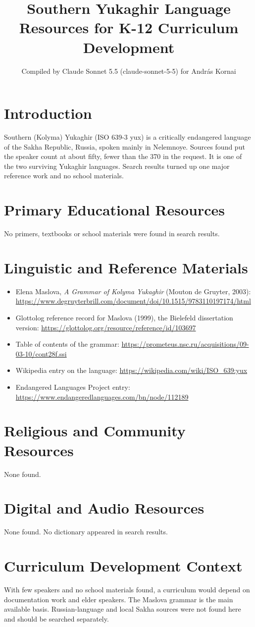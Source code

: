 \documentclass[12pt]{article}
\title{Southern Yukaghir Language Resources for K-12 Curriculum Development}
\author{Compiled by Claude Sonnet 5.5 (claude-sonnet-5-5) for Andr\'as Kornai}
\date{}
\begin{document}
\maketitle

\section{Introduction}
Southern (Kolyma) Yukaghir (ISO 639-3 yux) is a critically endangered language of the Sakha Republic, Russia, spoken mainly in Nelemnoye. Sources found put the speaker count at about fifty, fewer than the 370 in the request. It is one of the two surviving Yukaghir languages. Search results turned up one major reference work and no school materials.

\section{Primary Educational Resources}
No primers, textbooks or school materials were found in search results.

\section{Linguistic and Reference Materials}
\begin{itemize}
\item Elena Maslova, \emph{A Grammar of Kolyma Yukaghir} (Mouton de Gruyter, 2003): \url{https://www.degruyterbrill.com/document/doi/10.1515/9783110197174/html}
\item Glottolog reference record for Maslova (1999), the Bielefeld dissertation version: \url{https://glottolog.org/resource/reference/id/103697}
\item Table of contents of the grammar: \url{https://prometeus.nsc.ru/acquisitions/09-03-10/cont28f.ssi}
\item Wikipedia entry on the language: \url{https://wikipedia.com/wiki/ISO_639:yux}
\item Endangered Languages Project entry: \url{https://www.endangeredlanguages.com/bn/node/112189}
\end{itemize}

\section{Religious and Community Resources}
None found.

\section{Digital and Audio Resources}
None found. No dictionary appeared in search results.

\section{Curriculum Development Context}
With few speakers and no school materials found, a curriculum would depend on documentation work and elder speakers. The Maslova grammar is the main available basis. Russian-language and local Sakha sources were not found here and should be searched separately.
\end{document}
